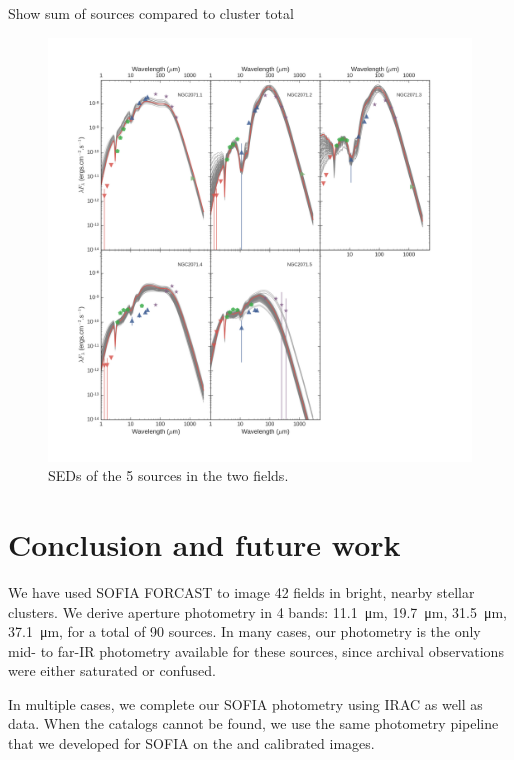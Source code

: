 Show sum of sources compared to cluster total


\begin{figure}
\begin{center}
\hspace*{-1in}
\includegraphics[width=1.4\textwidth]{Figures/NGC2071_SEDs.png}
\vspace{-1.5cm}
\caption[NGC2071 SEDs]{SEDs of the 5 sources in the two fields. }
\label{fig:NGC2071_SEDs}
\end{center}
\end{figure}



\section{Conclusion and future work}

We have used SOFIA FORCAST to image 42 fields in bright, nearby stellar clusters. We derive aperture photometry in 4 bands: \SI{11.1}{\um}, \SI{19.7}{\um}, \SI{31.5}{\um}, \SI{37.1}{\um}, for a total of 90 sources. In many cases, our photometry is the only mid- to far-IR photometry available for these sources, since archival \Spitzer observations were either saturated or confused.

In multiple cases, we complete our SOFIA photometry using \Spitzer IRAC as well as \Herschel data. When the catalogs cannot be found, we use the same photometry pipeline that we developed for SOFIA on the \Spitzer and \Herschel calibrated images.

